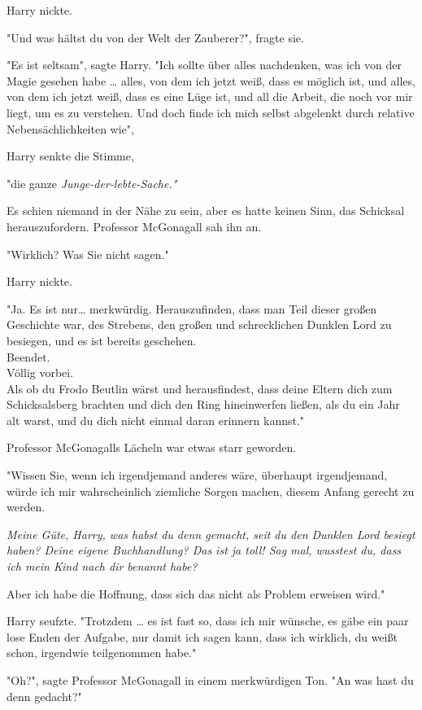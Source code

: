 {Harry nickte.

"Und was hältst du von der Welt der Zauberer?", fragte sie.

"Es ist seltsam", sagte Harry. "Ich sollte über alles nachdenken, was ich von der Magie gesehen habe … alles, von dem ich jetzt weiß, dass es möglich ist, und alles, von dem ich jetzt weiß, dass es eine Lüge ist, und all die Arbeit, die noch vor mir liegt, um es zu verstehen. Und doch finde ich mich selbst abgelenkt durch relative Nebensächlichkeiten wie",

Harry senkte die Stimme,

"die ganze \emph{Junge-der-lebte-Sache."}

Es schien niemand in der Nähe zu sein, aber es hatte keinen Sinn, das Schicksal herauszufordern. Professor McGonagall sah ihn an.

"Wirklich? Was Sie nicht sagen."

Harry nickte.

"Ja. Es ist nur… merkwürdig. Herauszufinden, dass man Teil dieser großen Geschichte war, des Strebens, den großen und schrecklichen Dunklen Lord zu besiegen, und es ist bereits geschehen.\\ Beendet.\\ Völlig vorbei.\\ Als ob du Frodo Beutlin wärst und herausfindest, dass deine Eltern dich zum Schicksalsberg brachten und dich den Ring hineinwerfen ließen, als du ein Jahr alt warst, und du dich nicht einmal daran erinnern kannst."

Professor McGonagalls Lächeln war etwas starr geworden.

"Wissen Sie, wenn ich irgendjemand anderes wäre, überhaupt irgendjemand, würde ich mir wahrscheinlich ziemliche Sorgen machen, diesem Anfang gerecht zu werden.

\emph{Meine Güte, Harry, was habst du denn gemacht, seit du den Dunklen Lord besiegt haben? Deine eigene Buchhandlung? Das ist ja toll! Sag mal, wusstest du, dass ich mein Kind nach dir benannt habe?}

Aber ich habe die Hoffnung, dass sich das nicht als Problem erweisen wird."

Harry seufzte. "Trotzdem … es ist fast so, dass ich mir wünsche, es gäbe ein paar lose Enden der Aufgabe, nur damit ich sagen kann, dass ich wirklich, du weißt schon, irgendwie teilgenommen habe."

"Oh?", sagte Professor McGonagall in einem merkwürdigen Ton. "An was hast du denn gedacht?"

}
